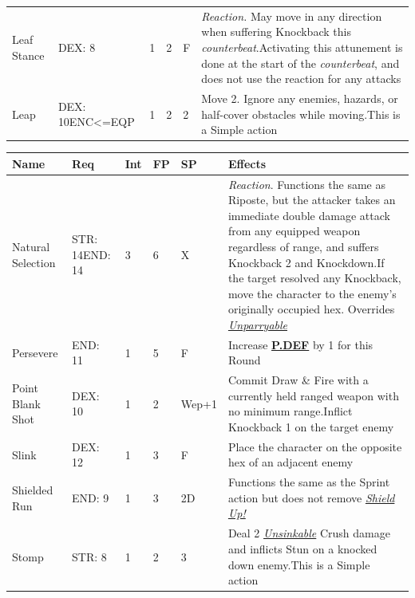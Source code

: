 \documentclass[12pt]{article}
\newcommand{\refto}[1]{\hyperlink{#1}{\textbf{#1}}}
\newcommand{\reftoit}[1]{\hyperlink{#1}{\emph{#1}}}
\begin{document}
\begin{center}
\begin{tabularx}{\textwidth}{p{}p{}p{}p{}p{}p{}}
Leaf Stance & DEX: 8 & 1 & 2 & F & \emph{Reaction.} May move in any direction when suffering Knockback this \emph{counterbeat}.\newline Activating this attunement is done at the start of the \emph{counterbeat}, and does not use the reaction for any attacks\\
Leap & DEX: 10\newline ENC<=EQP & 1 & 2 & 2 & Move 2. Ignore any enemies, hazards, or half-cover obstacles while moving.\newline This is a Simple action \\
\hline
\end{tabularx}
\end{center}

\pagebreak

\begin{center}
\begin{tabularx}{\textwidth}{p{}p{}p{}p{}p{}p{}}
\hline
\rowcolor{white} \textbf{Name} & \textbf{Req} & \textbf{Int} & \textbf{FP} & \textbf{SP} & \textbf{Effects}\setcounter{rownum}{0}\\
\hline
Natural Selection & STR: 14\newline END: 14 & 3 & 6 & X & \emph{Reaction}. Functions the same as Riposte, but the attacker takes an immediate double damage attack from any equipped weapon regardless of range, and suffers Knockback 2 and Knockdown.\newline If the target resolved any Knockback, move the character to the enemy’s originally occupied hex. \newline Overrides \reftoit{Unparryable} \\
Persevere & END: 11 & 1 & 5 & F & Increase \refto{P.DEF} by 1 for this Round \\
Point Blank Shot & DEX: 10 & 1 & 2 & Wep+1 & Commit Draw \& Fire with a currently held ranged weapon with no minimum range.\newline Inflict Knockback 1 on the target enemy\\
Slink & DEX: 12 & 1 & 3 & F & Place the character on the opposite hex of an adjacent enemy \\
Shielded Run & END: 9 & 1 & 3 & 2D & Functions the same as the Sprint action but does not remove \reftoit{Shield Up!}\\
Stomp & STR: 8 & 1 & 2 & 3 & Deal 2 \reftoit{Unsinkable} Crush damage and inflicts Stun on a knocked down enemy.\newline This is a Simple action\\

\end{tabularx}
\end{center}
\end{document}
